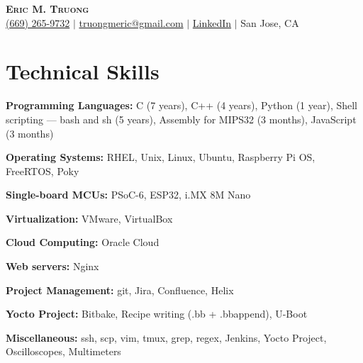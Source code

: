 \documentclass[letterpaper,11pt]{article}
\newcommand{\resumeSubHeadingListStart}{\begin{itemize}[leftmargin=0.15in, label={}]}
\newcommand{\resumeSubHeadingListEnd}{\end{itemize}}
\begin{document}

\begin{center}
    \textbf{\Huge \scshape Eric M. Truong} \\ \vspace{3pt}
    \small
    \faMobile \hspace{.5pt} \href{tel:6692659732}{(669) 265-9732}
    $|$
    \faAt \hspace{.5pt} \href{mailto:truongmeric@gmail.com}{truongmeric@gmail.com}
    $|$
    \faLinkedinSquare \hspace{.5pt} \href{https://www.linkedin.com/in/eric-m-truong/}{LinkedIn}
    $|$
    \faMapMarker \hspace{.5pt} San Jose, CA
\end{center}




\section{Technical Skills}
  \vspace{2pt}
  \resumeSubHeadingListStart
    \small{\item{

        \textbf{Programming Languages:}{ C (7 years), C++ (4 years), Python (1 year), Shell scripting --- bash and sh (5 years), Assembly for MIPS32 (3 months), JavaScript (3 months)} \\ \vspace{3pt}

        \textbf{Operating Systems:}{ RHEL, Unix, Linux, Ubuntu, Raspberry Pi OS, FreeRTOS, Poky} \\ \vspace{3pt}

        \textbf{Single-board MCUs:}{ PSoC-6, ESP32, i.MX 8M Nano} \\ \vspace{3pt}

        \textbf{Virtualization:}{ VMware, VirtualBox} \\ \vspace{3pt}

        \textbf{Cloud Computing:}{ Oracle Cloud} \\ \vspace{3pt}

        \textbf{Web servers:}{ Nginx} \\ \vspace{3pt}

        \textbf{Project Management:}{ git, Jira, Confluence, Helix} \\ \vspace{3pt}

        \textbf{Yocto Project:}{ Bitbake, Recipe writing (.bb + .bbappend), U-Boot} \\ \vspace{3pt}

        \textbf{Miscellaneous:}{ ssh, scp, vim, tmux, grep, regex, Jenkins, Yocto Project, Oscilloscopes, Multimeters}

    }}
  \resumeSubHeadingListEnd
\end{document}
